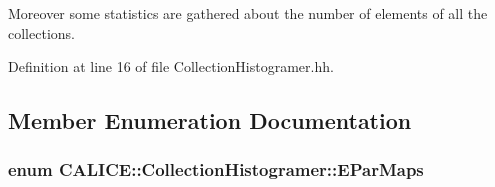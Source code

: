 Moreover some statistics are gathered about the number of elements of all the collections. 

Definition at line 16 of file Collection\-Histogramer.\-hh.



\subsection{Member Enumeration Documentation}
\subsubsection[{E\-Par\-Maps}]{\setlength{\rightskip}{0pt plus 5cm}enum {\bf C\-A\-L\-I\-C\-E\-::\-Collection\-Histogramer\-::\-E\-Par\-Maps}\hspace{0.3cm}{\ttfamily [protected]}}\label{classCALICE_1_1CollectionHistogramer_aa8e603a270748b41657cbdfc32a26f19}
